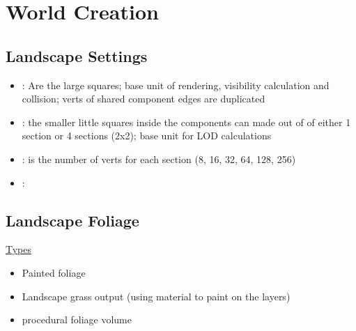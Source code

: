 \chapter{World Creation}
    \section{Landscape Settings}
        \begin{itemize}
            \item {}: Are the large squares; base unit of rendering, visibility calculation and collision; verts of shared component edges are duplicated
            \item {}: the smaller little squares inside the components can made out of of either 1 section or 4 sections (2x2); base unit for LOD calculations
            \item {}: is the number of verts for each section (8, 16, 32, 64, 128, 256)
            \item {}:
        \end{itemize}

    \section{Landscape Foliage}
        \underline{Types}
        \begin{itemize}
            \item Painted foliage
            \item Landscape grass output (using material to paint on the layers)
            \item procedural foliage volume
        \end{itemize}
        
